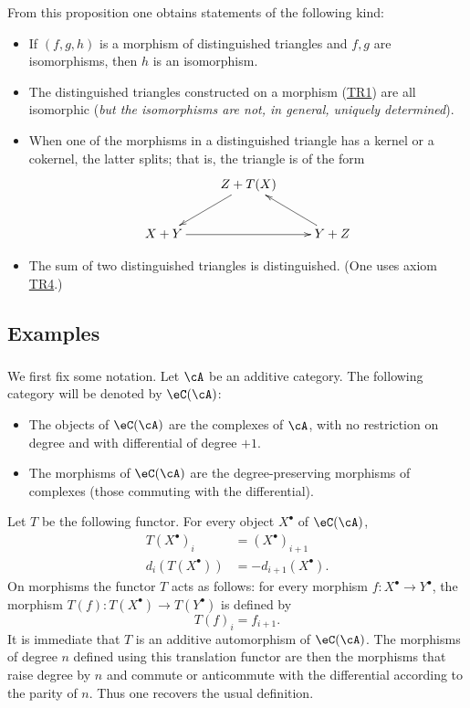 From this proposition one obtains statements of the following kind:
\begin{itemize}
  \item If $(f,g,h)$ is a morphism of distinguished triangles and $f,g$
    are isomorphisms, then $h$ is an isomorphism.
  \item The distinguished triangles constructed on a morphism
    (\hyperlink{VIII:TR1}{TR1}) are all isomorphic (\emph{but the
    isomorphisms are not, in general, uniquely determined}).
  \item When one of the morphisms in a distinguished triangle has a kernel
    or a cokernel, the latter splits; that is, the triangle is of the form
    \[\xymatrix{
      & Z+T(X) \ar[dl] \\
      X+Y \ar[rr]
        & & Y+Z \ar[ul]
    }\]
  \item The sum of two distinguished triangles is distinguished. (One uses
    axiom \hyperlink{VIII:TR4}{TR4}.)
\end{itemize}

\subsection{Examples}\label{VIII:1-2}

\subsubsection{}\label{VIII:1-2-1}

We first fix some notation. Let $\cA$ be an additive category.
The following category will be denoted by $\eC(\cA)$:
\begin{itemize}
  \item The objects of $\eC(\cA)$ are the complexes of $\cA$, with no
    restriction on degree and with differential of degree $+1$.
  \item The morphisms of $\eC(\cA)$ are the degree-preserving morphisms of
    complexes (those commuting with the differential).
\end{itemize}

Let $T$ be the following functor. For every object $X^\bullet$ of
$\eC(\cA)$,
\begin{align*}
  T(X^\bullet)_i &= (X^\bullet)_{i+1} \\
  d_i(T(X^\bullet)) &= -d_{i+1}(X^\bullet)  \text{.}
\end{align*}
On morphisms the functor $T$ acts as follows: for every morphism
$f:X^\bullet \to Y^\bullet$, the morphism
$T(f):T(X^\bullet) \to T(Y^\bullet)$ is defined by
\[
  T(f)_i = f_{i+1} \text{.}
\]
It is immediate that $T$ is an additive automorphism of $\eC(\cA)$.
The morphisms of degree $n$ defined using this translation functor are
then the morphisms that raise degree by $n$ and commute or anticommute
with the differential according to the parity of $n$. Thus one recovers
the usual definition.

